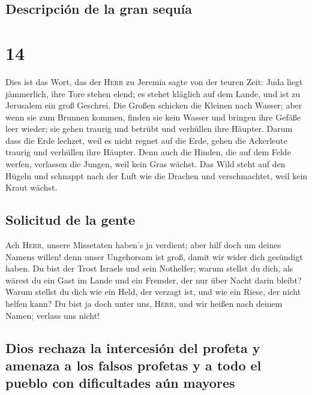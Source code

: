 \hypertarget{descripciuxf3n-de-la-gran-sequuxeda}{%
\subsection{Descripción de la gran
sequía}\label{descripciuxf3n-de-la-gran-sequuxeda}}

\hypertarget{section-13}{%
\section{14}\label{section-13}}

 Dies ist das Wort, das der \textsc{Herr} zu Jeremia sagte
von der teuren Zeit:  Juda liegt jämmerlich, ihre Tore
stehen elend; es stehet kläglich auf dem Lande, und ist zu Jerusalem ein
groß Geschrei.  Die Großen schicken die Kleinen nach
Wasser; aber wenn sie zum Brunnen kommen, finden sie kein Wasser und
bringen ihre Gefäße leer wieder; sie gehen traurig und betrübt und
verhüllen ihre Häupter.  Darum dass die Erde lechzet, weil
es nicht regnet auf die Erde, gehen die Ackerleute traurig und verhüllen
ihre Häupter.  Denn auch die Hinden, die auf dem Felde
werfen, verlassen die Jungen, weil kein Gras wächst.  Das
Wild steht auf den Hügeln und schnappt nach der Luft wie die Drachen und
verschmachtet, weil kein Kraut wächst.

\hypertarget{solicitud-de-la-gente}{%
\subsection{Solicitud de la gente}\label{solicitud-de-la-gente}}

 Ach \textsc{Herr}, unsere Missetaten haben's ja verdient;
aber hilf doch um deines Namens willen! denn unser Ungehorsam ist groß,
damit wir wider dich gesündigt haben.  Du bist der Trost
Israels und sein Nothelfer; warum stellst du dich, als wärest du ein
Gast im Lande und ein Fremder, der nur über Nacht darin bleibt?
 Warum stellst du dich wie ein Held, der verzagt ist, und
wie ein Riese, der nicht helfen kann? Du bist ja doch unter uns,
\textsc{Herr}, und wir heißen nach deinem Namen; verlass uns nicht!

\hypertarget{dios-rechaza-la-intercesiuxf3n-del-profeta-y-amenaza-a-los-falsos-profetas-y-a-todo-el-pueblo-con-dificultades-auxfan-mayores}{%
\subsection{Dios rechaza la intercesión del profeta y amenaza a los
falsos profetas y a todo el pueblo con dificultades aún
mayores}\label{dios-rechaza-la-intercesiuxf3n-del-profeta-y-amenaza-a-los-falsos-profetas-y-a-todo-el-pueblo-con-dificultades-auxfan-mayores}}

